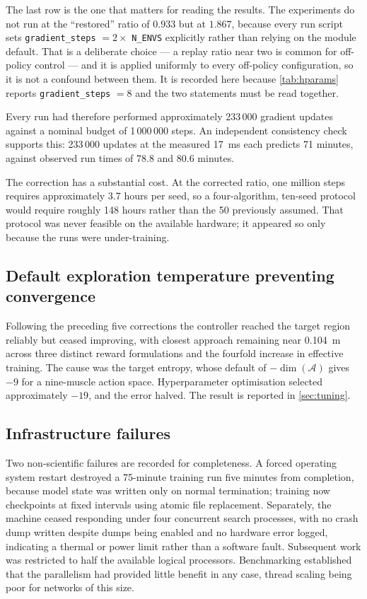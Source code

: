 The last row is the one that matters for reading the results. The experiments do
not run at the ``restored'' ratio of $0.933$ but at $1.867$, because every run
script sets \texttt{gradient\_steps} $= 2 \times$ \texttt{N\_ENVS} explicitly
rather than relying on the module default. That is a deliberate choice --- a
replay ratio near two is common for off-policy control --- and it is applied
uniformly to every off-policy configuration, so it is not a confound between
them. It is recorded here because \cref{tab:hparams} reports
\texttt{gradient\_steps} $=8$ and the two statements must be read together.

Every run had therefore performed approximately 233\,000 gradient updates against
a nominal budget of 1\,000\,000 steps. An independent consistency check supports
this: 233\,000 updates at the measured \SI{17}{\milli\second} each predicts
71 minutes, against observed run times of 78.8 and 80.6 minutes.

The correction has a substantial cost. At the corrected ratio, one million steps
requires approximately 3.7 hours per seed, so a four-algorithm, ten-seed protocol
would require roughly 148 hours rather than the 50 previously assumed. That
protocol was never feasible on the available hardware; it appeared so only because
the runs were under-training.

\subsection{Default exploration temperature preventing convergence}
\label{sec:entropydefect}

Following the preceding five corrections the controller reached the target region
reliably but ceased improving, with closest approach remaining near
\SI{0.104}{\meter} across three distinct reward formulations and the fourfold
increase in effective training. The cause was the \SAC target entropy, whose
default of $-\dim(\mathcal{A})$ gives $-9$ for a nine-muscle action space.
Hyperparameter optimisation selected approximately $-19$, and the error halved.
The result is reported in \cref{sec:tuning}.

\subsection{Infrastructure failures}

Two non-scientific failures are recorded for completeness. A forced operating
system restart destroyed a 75-minute training run five minutes from completion,
because model state was written only on normal termination; training now
checkpoints at fixed intervals using atomic file replacement. Separately, the
machine ceased responding under four concurrent search processes, with no crash
dump written despite dumps being enabled and no hardware error logged, indicating
a thermal or power limit rather than a software fault. Subsequent work was
restricted to half the available logical processors. Benchmarking established
that the parallelism had provided little benefit in any case, thread scaling being
poor for networks of this size.


